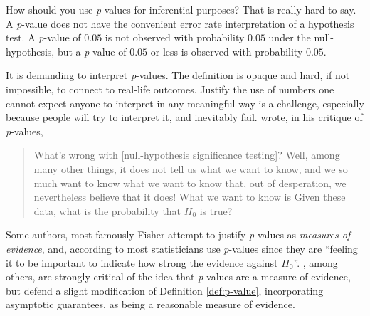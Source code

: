How should you use \textit{p}-values for inferential purposes? That is really hard to say. A \textit{p}-value does not have the convenient error rate interpretation of a hypothesis test. A \textit{p}-value of $0.05$ is not observed with probability $0.05$ under the null-hypothesis, but a \textit{p}-value of $0.05$ or less is observed with probability $0.05$. 

It is demanding to interpret \textit{p}-values. The definition is opaque and hard, if not impossible, to connect to real-life outcomes. Justify the use of numbers one cannot expect anyone to interpret in any meaningful way is a challenge, especially because people will try to interpret it, and inevitably fail. \textcite{Cohen1994-au} wrote, in his critique of \textit{p}-values, 
\begin{quotation}
What's wrong with {[}null-hypothesis significance testing{]}? Well, among many other things, it does not tell us what we want to know, and we so much want to know what we want to know that, out of desperation, we nevertheless believe that it does! What we want to know is \textquotedbl Given these data, what is the probability that $H_{0}$ is true?\textquotedbl{}
\end{quotation}
Some authors, most famously Fisher \parencite{Liu2020-er} attempt to justify \textit{p}-values
as \textit{measures of evidence}, and, according to \textcite{Berger1987-tf}
most statisticians use \textit{p}-values since they are ``feeling it
to be important to indicate how strong the evidence against $H_{0}$''.
\textcite{Hubbard2008-cg}, among others, are strongly critical of the idea that \textit{p}-values are a measure of evidence, but \textcite{Liu2020-er} defend a slight modification of Definition \ref{def:p-value}, incorporating asymptotic guarantees, as being a reasonable measure of evidence.

